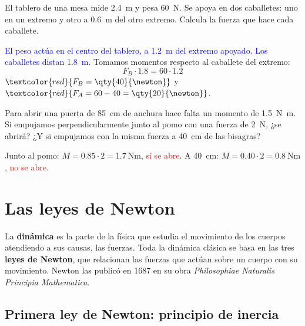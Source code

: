 \begin{exercise}
    El tablero de una mesa mide \qty{2.4}{\m} y pesa \qty{60}{\newton}. Se apoya en dos caballetes: uno en un extremo y otro a
    \qty{0.6}{\m} del otro extremo. Calcula la fuerza que hace cada caballete.
    \begin{solu}
        \textcolor{blue}{El peso actúa en el centro del tablero, a \qty{1.2}{\m} del extremo apoyado.}
        \textcolor{blue}{Los caballetes distan \qty{1.8}{\m}.} Tomamos momentos respecto al caballete del extremo:
        \[ F_B \cdot \num{1.8} = 60 \cdot \num{1.2} \]
        \(\textcolor{red}{F_B = \qty{40}{\newton}}\) y \(\textcolor{red}{F_A = 60 - 40 = \qty{20}{\newton}}\).
    \end{solu}
\end{exercise}

\begin{exercise}
    Para abrir una puerta de \qty{85}{\cm} de anchura hace falta un momento de \qty{1.5}{\newton\metre}. Si empujamos
    perpendicularmente junto al pomo con una fuerza de \qty{2}{\newton}, ¿se abrirá? ¿Y si empujamos con la misma fuerza a
    \qty{40}{\cm} de las bisagras?
    \begin{solu}
        Junto al pomo: \(M = \num{0.85} \cdot 2 = \qty{1.7}{\newton\metre}\), \textcolor{red}{sí se abre}. A \qty{40}{\cm}:
        \(M = \num{0.40} \cdot 2 = \qty{0.8}{\newton\metre}\), \textcolor{red}{no se abre}.
    \end{solu}
\end{exercise}

\section{Las leyes de Newton}\label{sec:ud10-newton}

La \textbf{dinámica} es la parte de la física que estudia el movimiento de los cuerpos atendiendo a sus causas, las fuerzas. Toda la
dinámica clásica se basa en las tres \textbf{leyes de Newton}, que relacionan las fuerzas que actúan sobre un cuerpo con su movimiento.
Newton las publicó en 1687 en su obra \textit{Philosophiae Naturalis Principia Mathematica}.

\subsection{Primera ley de Newton: principio de inercia}

